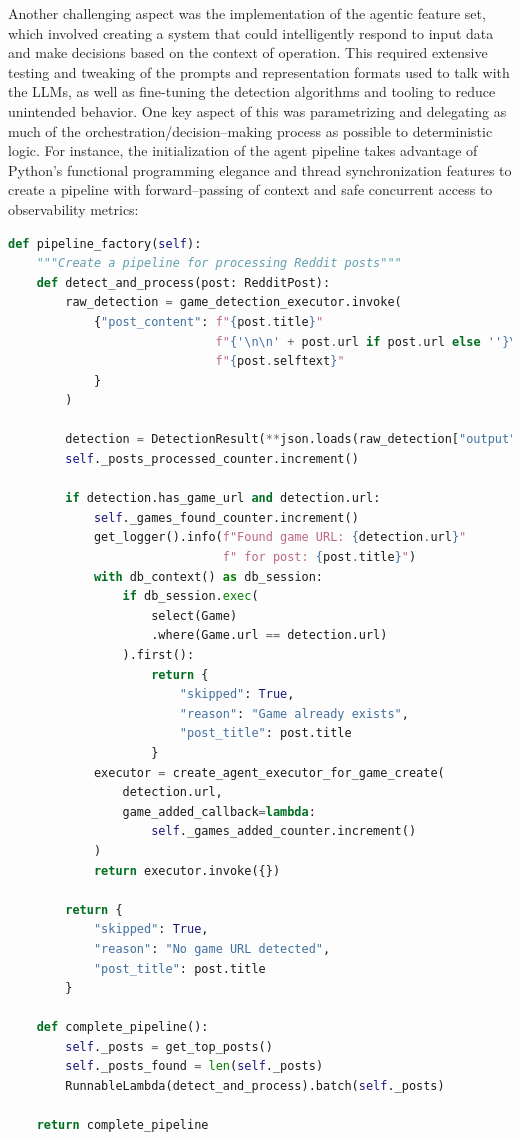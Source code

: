 \documentclass[11pt,italian,a4paper]{article}
\begin{document}
Another challenging aspect was the implementation of the agentic feature set, which involved creating a system that could intelligently respond to input data and make decisions based on the context of operation. This required extensive testing and tweaking of the prompts and representation formats used to talk with the LLMs, as well as fine-tuning the detection algorithms and tooling to reduce unintended behavior. One key aspect of this was parametrizing and delegating as much of the orchestration/decision--making process as possible to deterministic logic. For instance, the initialization of the agent pipeline takes advantage of Python's functional programming elegance and thread synchronization features to create a pipeline with forward--passing of context and safe concurrent access to observability metrics:

\begin{lstlisting}[language=Python]
def pipeline_factory(self):
    """Create a pipeline for processing Reddit posts"""
    def detect_and_process(post: RedditPost):
        raw_detection = game_detection_executor.invoke(
            {"post_content": f"{post.title}"
                             f"{'\n\n' + post.url if post.url else ''}\n\n"
                             f"{post.selftext}"
            }
        )

        detection = DetectionResult(**json.loads(raw_detection["output"]))
        self._posts_processed_counter.increment()

        if detection.has_game_url and detection.url:
            self._games_found_counter.increment()
            get_logger().info(f"Found game URL: {detection.url}"
                              f" for post: {post.title}")
            with db_context() as db_session:
                if db_session.exec(
                    select(Game)
                    .where(Game.url == detection.url)
                ).first():
                    return {
                        "skipped": True,
                        "reason": "Game already exists",
                        "post_title": post.title
                    }
            executor = create_agent_executor_for_game_create(
                detection.url,
                game_added_callback=lambda:
                    self._games_added_counter.increment()
            )
            return executor.invoke({})

        return {
            "skipped": True,
            "reason": "No game URL detected",
            "post_title": post.title
        }

    def complete_pipeline():
        self._posts = get_top_posts()
        self._posts_found = len(self._posts)
        RunnableLambda(detect_and_process).batch(self._posts)

    return complete_pipeline
\end{lstlisting}
\end{document}

